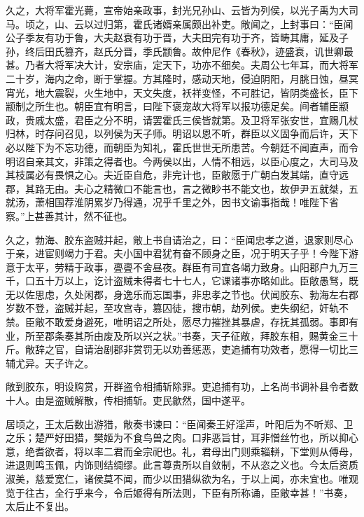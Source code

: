 \documentclass[12pt,UTF8]{ctexbook}
\begin{document}
久之，大将军霍光薨，宣帝始亲政事，封光兄孙山、云皆为列侯，以光子禹为大司马。顷之，山、云以过归第，霍氏诸婿亲属颇出补吏。敞闻之，上封事曰：“臣闻公子季友有功于鲁，大夫赵衰有功于晋，大夫田完有功于齐，皆畴其庸，延及子孙，终后田氏篡齐，赵氏分晋，季氏颛鲁。故仲尼作《春秋》，迹盛衰，讥世卿最甚。乃者大将军决大计，安宗庙，定天下，功亦不细矣。夫周公七年耳，而大将军二十岁，海内之命，断于掌握。方其隆时，感动天地，侵迫阴阳，月朓日蚀，昼冥宵光，地大震裂，火生地中，天文失度，袄祥变怪，不可胜记，皆阴类盛长，臣下颛制之所生也。朝臣宜有明言，曰陛下褒宠故大将军以报功德足矣。间者辅臣颛政，贵戚太盛，君臣之分不明，请罢霍氏三侯皆就第。及卫将军张安世，宜赐几杖归林，时存问召见，以列侯为天子师。明诏以恩不听，群臣以义固争而后许，天下必以陛下为不忘功德，而朝臣为知礼，霍氏世世无所患苦。今朝廷不闻直声，而令明诏自亲其文，非策之得者也。今两侯以出，人情不相远，以臣心度之，大司马及其枝属必有畏惧之心。夫近臣自危，非完计也，臣敞愿于广朝白发其端，直守远郡，其路无由。夫心之精微口不能言也，言之微眇书不能文也，故伊尹五就桀，五就汤，萧相国荐淮阴累岁乃得通，况乎千里之外，因书文谕事指哉！唯陛下省察。”上甚善其计，然不征也。



久之，勃海、胶东盗贼并起，敞上书自请治之，曰：“臣闻忠孝之道，退家则尽心于亲，进宦则竭力于君。夫小国中君犹有奋不顾身之臣，况于明天子乎！今陛下游意于太平，劳精于政事，亹亹不舍昼夜。群臣有司宜各竭力致身。山阳郡户九万三千，口五十万以上，讫计盗贼未得者七十七人，它课诸事亦略如此。臣敞愚驽，既无以佐思虑，久处闲郡，身逸乐而忘国事，非忠孝之节也。伏闻胶东、勃海左右郡岁数不登，盗贼并起，至攻宫寺，篡囚徒，搜市朝，劫列侯。吏失纲纪，奸轨不禁。臣敞不敢爱身避死，唯明诏之所处，愿尽力摧挫其暴虐，存抚其孤弱。事即有业，所至郡条奏其所由废及所以兴之状。”书奏，天子征敞，拜胶东相，赐黄金三十斤。敞辞之官，自请治剧郡非赏罚无以劝善惩恶，吏追捕有功效者，愿得一切比三辅尤异。天子许之。



敞到胶东，明设购赏，开群盗令相捕斩除罪。吏追捕有功，上名尚书调补县令者数十人。由是盗贼解散，传相捕斩。吏民歙然，国中遂平。



居顷之，王太后数出游猎，敞奏书谏曰：“臣闻秦王好淫声，叶阳后为不听郑、卫之乐；楚严好田猎，樊姬为不食鸟兽之肉。口非恶旨甘，耳非憎丝竹也，所以抑心意，绝耆欲者，将以率二君而全宗祀也。礼，君母出门则乘辎軿，下堂则从傅母，进退则鸣玉佩，内饰则结绸缪。此言尊贵所以自敛制，不从恣之义也。今太后资质淑美，慈爱宽仁，诸侯莫不闻，而少以田猎纵欲为名，于以上闻，亦未宜也。唯观览于往古，全行乎来今，令后姬得有所法则，下臣有所称诵，臣敞幸甚！”书奏，太后止不复出。
\end{document}
